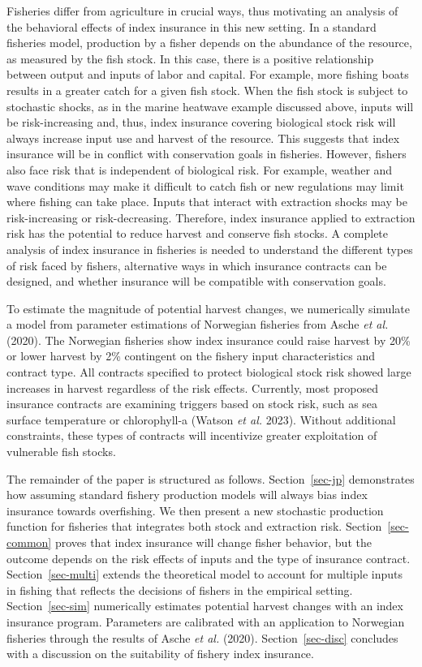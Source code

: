 \documentclass[
  letterpaper,
  DIV=11,
  numbers=noendperiod]{scrartcl}
\theoremstyle{plain}
\theoremstyle{plain}
\theoremstyle{remark}
\begin{document}
Fisheries differ from agriculture in crucial ways, thus motivating an
analysis of the behavioral effects of index insurance in this new
setting. In a standard fisheries model, production by a fisher depends
on the abundance of the resource, as measured by the fish stock. In this
case, there is a positive relationship between output and inputs of
labor and capital. For example, more fishing boats results in a greater
catch for a given fish stock. When the fish stock is subject to
stochastic shocks, as in the marine heatwave example discussed above,
inputs will be risk-increasing and, thus, index insurance covering
biological stock risk will always increase input use and harvest of the
resource. This suggests that index insurance will be in conflict with
conservation goals in fisheries. However, fishers also face risk that is
independent of biological risk. For example, weather and wave conditions
may make it difficult to catch fish or new regulations may limit where
fishing can take place. Inputs that interact with extraction shocks may
be risk-increasing or risk-decreasing. Therefore, index insurance
applied to extraction risk has the potential to reduce harvest and
conserve fish stocks. A complete analysis of index insurance in
fisheries is needed to understand the different types of risk faced by
fishers, alternative ways in which insurance contracts can be designed,
and whether insurance will be compatible with conservation goals.

To estimate the magnitude of potential harvest changes, we numerically
simulate a model from parameter estimations of Norwegian fisheries from
Asche \emph{et al.} (2020). The Norwegian fisheries show index insurance
could raise harvest by 20\% or lower harvest by 2\% contingent on the
fishery input characteristics and contract type. All contracts specified
to protect biological stock risk showed large increases in harvest
regardless of the risk effects. Currently, most proposed insurance
contracts are examining triggers based on stock risk, such as sea
surface temperature or chlorophyll-a (Watson \emph{et al.} 2023).
Without additional constraints, these types of contracts will
incentivize greater exploitation of vulnerable fish stocks.

The remainder of the paper is structured as follows.
Section~\ref{sec-jp} demonstrates how assuming standard fishery
production models will always bias index insurance towards overfishing.
We then present a new stochastic production function for fisheries that
integrates both stock and extraction risk. Section~\ref{sec-common}
proves that index insurance will change fisher behavior, but the outcome
depends on the risk effects of inputs and the type of insurance
contract. Section~\ref{sec-multi} extends the theoretical model to
account for multiple inputs in fishing that reflects the decisions of
fishers in the empirical setting. Section~\ref{sec-sim} numerically
estimates potential harvest changes with an index insurance program.
Parameters are calibrated with an application to Norwegian fisheries
through the results of Asche \emph{et al.} (2020).
Section~\ref{sec-disc} concludes with a discussion on the suitability of
fishery index insurance.
\end{document}
